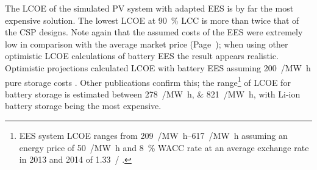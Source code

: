 
The LCOE of the simulated PV system with adapted EES is by far the most expensive solution. The lowest LCOE at \SI{90}{\percent} LCC is more than twice that of the CSP designs. Note again that the assumed costs of the EES were extremely low in comparison with the average market price (Page~\pageref{SUBSUBPVFinancialparameter}); when using other optimistic LCOE calculations of battery EES the result appears realistic. Optimistic projections calculated LCOE with battery EES assuming \SI{200}{\usd/\mega\watt\hour} pure storage costs \cite{Corcuera2015}. Other publications confirm this; the range\footnote{EES system LCOE ranges from \SIrange{209}{617}{\eur/\mega\watt\hour} assuming an energy price of \SI{50}{\eur/\mega\watt\hour} and \SI{8}{\percent} WACC rate \cite{Zakeri2015} at an average exchange rate in 2013 and 2014 of \SI{1.33}{\usd/\eur} \cite{StatistaGmbH2015}.} of LCOE for battery storage is estimated between \SIlist{278;821}{\usd/\mega\watt\hour}, with Li-ion battery storage being the most expensive.


